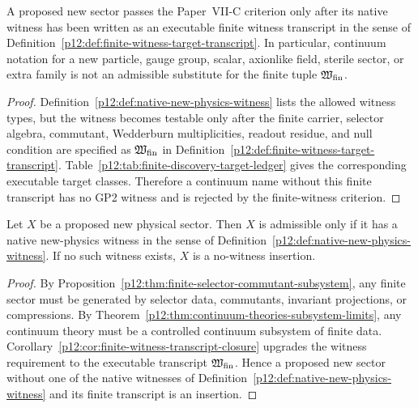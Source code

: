\documentclass[12pt,a4paper]{article}
\begin{document}
\begin{corollary}
\label{p12:cor:finite-witness-transcript-closure}
A proposed new sector passes the Paper~VII-C criterion only after its native witness has been written as an executable finite witness transcript in the sense of Definition~\ref{p12:def:finite-witness-target-transcript}.  In particular, continuum notation for a new particle, gauge group, scalar, axionlike field, sterile sector, or extra family is not an admissible substitute for the finite tuple \(\mathfrak W_{\rm fin}\).
\end{corollary}
\begin{proof}
Definition~\ref{p12:def:native-new-physics-witness} lists the allowed witness types, but the witness becomes testable only after the finite carrier, selector algebra, commutant, Wedderburn multiplicities, readout residue, and null condition are specified as \(\mathfrak W_{\rm fin}\) in Definition~\ref{p12:def:finite-witness-target-transcript}.  Table~\ref{p12:tab:finite-discovery-target-ledger} gives the corresponding executable target classes.  Therefore a continuum name without this finite transcript has no GP2 witness and is rejected by the finite-witness criterion.
\end{proof}

\begin{theorem}
\label{p12:thm:finite-witness-criterion-new-sectors}
Let \(X\) be a proposed new physical sector.  Then \(X\) is admissible only if it has a native new-physics witness in the sense of Definition~\ref{p12:def:native-new-physics-witness}.  If no such witness exists, \(X\) is a no-witness insertion.
\end{theorem}

\begin{proof}
By Proposition~\ref{p12:thm:finite-selector-commutant-subsystem}, any finite sector must be generated by selector data, commutants, invariant projections, or compressions.  By Theorem~\ref{p12:thm:continuum-theories-subsystem-limits}, any continuum theory must be a controlled continuum subsystem of finite data.  Corollary~\ref{p12:cor:finite-witness-transcript-closure} upgrades the witness requirement to the executable transcript \(\mathfrak W_{\rm fin}\).  Hence a proposed new sector without one of the native witnesses of Definition~\ref{p12:def:native-new-physics-witness} and its finite transcript is an insertion.
\end{proof}
\end{document}
